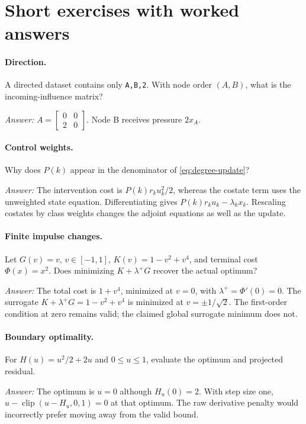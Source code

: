 \documentclass[11pt,a4paper]{article}
\DeclareMathOperator{\clip}{clip}
\theoremstyle{definition}
\theoremstyle{remark}
\begin{document}
\appendix
\section{Short exercises with worked answers}
\paragraph{Direction.} A directed dataset contains only \texttt{A,B,2}. With node order $(A,B)$, what is the incoming-influence matrix?\par
\emph{Answer:} $A=\left[\begin{smallmatrix}0&0\\2&0\end{smallmatrix}\right]$. Node B receives pressure $2x_A$.

\paragraph{Control weights.} Why does $P(k)$ appear in the denominator of \eqref{eq:degree-update}?\par
\emph{Answer:} The intervention cost is $P(k)r_ku_k^2/2$, whereas the costate term uses the unweighted state equation. Differentiating gives $P(k)r_ku_k-\lambda_kx_k$. Rescaling costates by class weights changes the adjoint equations as well as the update.

\paragraph{Finite impulse changes.} Let $G(v)=v$, $v\in[-1,1]$, $K(v)=1-v^2+v^4$, and terminal cost $\Phi(x)=x^2$. Does minimizing $K+\lambda^+G$ recover the actual optimum?\par
\emph{Answer:} The total cost is $1+v^4$, minimized at $v=0$, with $\lambda^+=\Phi'(0)=0$. The surrogate $K+\lambda^+G=1-v^2+v^4$ is minimized at $v=\pm1/\sqrt2$. The first-order condition at zero remains valid; the claimed global surrogate minimum does not.

\paragraph{Boundary optimality.} For $H(u)=u^2/2+2u$ and $0\le u\le1$, evaluate the optimum and projected residual.\par
\emph{Answer:} The optimum is $u=0$ although $H_u(0)=2$. With step size one, $u-\clip(u-H_u,0,1)=0$ at that optimum. The raw derivative penalty would incorrectly prefer moving away from the valid bound.
\end{document}
